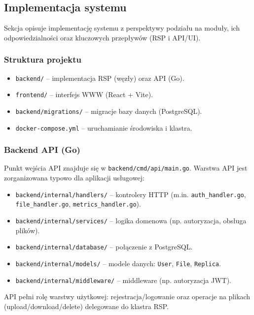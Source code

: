 \documentclass[12pt,a4paper]{article}
\begin{document}
	\subsection{Implementacja systemu}
	Sekcja opisuje implementację systemu z perspektywy podziału na moduły, ich odpowiedzialności oraz kluczowych przepływów (RSP i API/UI).

	\subsubsection{Struktura projektu}
	\begin{itemize}
		\item \texttt{backend/} -- implementacja RSP (węzły) oraz API (Go).
		\item \texttt{frontend/} -- interfejs WWW (React + Vite).
		\item \texttt{backend/migrations/} -- migracje bazy danych (PostgreSQL).
		\item \texttt{docker-compose.yml} -- uruchamianie środowiska i klastra.
	\end{itemize}

	\subsubsection{Backend API (Go)}
	Punkt wejścia API znajduje się w \texttt{backend/cmd/api/main.go}. Warstwa API jest zorganizowana typowo dla aplikacji usługowej:
	\begin{itemize}
		\item \texttt{backend/internal/handlers/} -- kontrolery HTTP (m.in. \texttt{auth\_handler.go}, \texttt{file\_handler.go}, \texttt{metrics\_handler.go}).
		\item \texttt{backend/internal/services/} -- logika domenowa (np. autoryzacja, obsługa plików).
		\item \texttt{backend/internal/database/} -- połączenie z PostgreSQL.
		\item \texttt{backend/internal/models/} -- modele danych: \texttt{User}, \texttt{File}, \texttt{Replica}.
		\item \texttt{backend/internal/middleware/} -- middleware (np. autoryzacja JWT).
	\end{itemize}
	API pełni rolę warstwy użytkowej: rejestracja/logowanie oraz operacje na plikach (upload/download/delete) delegowane do klastra RSP.
\end{document}
